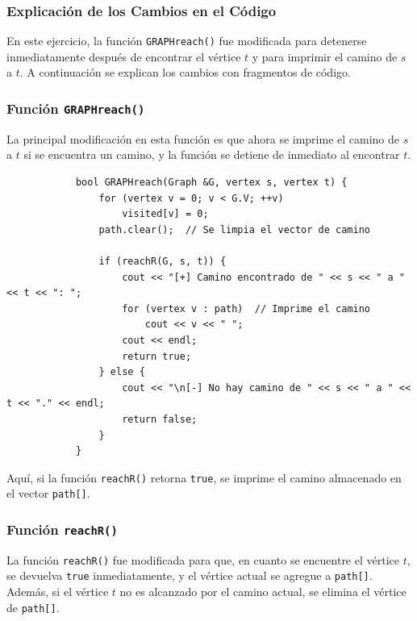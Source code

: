 \documentclass{article}
\begin{document}
        \subsubsection*{Explicación de los Cambios en el Código}
            En este ejercicio, la función \texttt{GRAPHreach()} fue modificada para detenerse inmediatamente después de encontrar el vértice \( t \) y para imprimir el camino de \( s \) a \( t \). A continuación se explican los cambios con fragmentos de código.
            
        \subsubsection*{Función \texttt{GRAPHreach()}}
            La principal modificación en esta función es que ahora se imprime el camino de \( s \) a \( t \) si se encuentra un camino, y la función se detiene de inmediato al encontrar \( t \).
            
            \begin{verbatim}
            bool GRAPHreach(Graph &G, vertex s, vertex t) {
                for (vertex v = 0; v < G.V; ++v)
                    visited[v] = 0;
                path.clear();  // Se limpia el vector de camino
            
                if (reachR(G, s, t)) {
                    cout << "[+] Camino encontrado de " << s << " a " << t << ": ";
                    for (vertex v : path)  // Imprime el camino
                        cout << v << " ";
                    cout << endl;
                    return true;
                } else {
                    cout << "\n[-] No hay camino de " << s << " a " << t << "." << endl;
                    return false;
                }
            }
            \end{verbatim}

        Aquí, si la función \texttt{reachR()} retorna \texttt{true}, se imprime el camino almacenado en el vector \texttt{path[]}.

        \subsubsection*{Función \texttt{reachR()}} 
            La función \texttt{reachR()} fue modificada para que, en cuanto se encuentre el vértice \( t \), se devuelva \texttt{true} inmediatamente, y el vértice actual se agregue a \texttt{path[]}. Además, si el vértice \( t \) no es alcanzado por el camino actual, se elimina el vértice de \texttt{path[]}.
            
\end{document}
